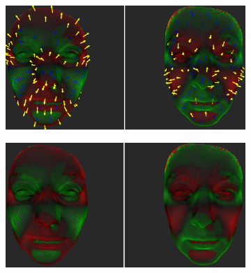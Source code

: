 \begin{figure}[h]
\centering
\begin{subfigure}{0.49\textwidth}
\includegraphics[width=\textwidth]{./img-study/pair10.PNG}
\caption{}
\label{fig:study-3-10}
\end{subfigure}
\begin{subfigure}{0.49\textwidth}
\includegraphics[width=\textwidth]{./img-study/pair7.PNG}
\caption{}
\label{fig:study-3-7}
\end{subfigure}


\end{figure}
